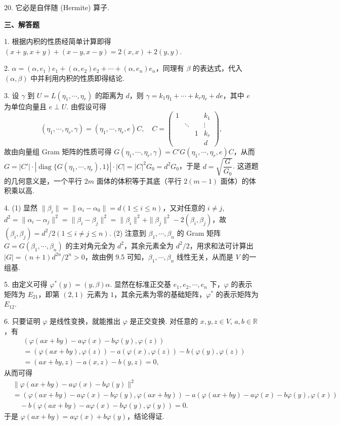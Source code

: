 \documentclass[UTF8,12pt,a4paper,fontset=fandol]{ctexart}
\begin{document}
20. 它必是自伴随 (Hermite) 算子.

\noindent\textbf{三、解答题}

1. 根据内积的性质经简单计算即得 $(x+y,x+y)+(x-y,x-y)=2(x,x)+2(y,y)$.

2. $\alpha=(\alpha,e_1)e_1+(\alpha,e_2)e_2+\cdots+(\alpha,e_n)e_n$，同理有 $\beta$ 的表达式，代入 $(\alpha,\beta)$ 中并利用内积的性质即得结论.

3. 设 $\gamma$ 到 $U=L(\eta_1,\cdots,\eta_r)$ 的距离为 $d$，则 $\gamma=k_1\eta_1+\cdots+k_r\eta_r+de$，其中 $e$ 为单位向量且 $e\perp U$. 由假设可得
\[
(\eta_1,\cdots,\eta_r,\gamma)=(\eta_1,\cdots,\eta_r,e)C,\quad
C=\begin{pmatrix}
1&&&k_1\\
&\ddots&&\vdots\\
&&1&k_r\\
&&&d
\end{pmatrix},
\]
故由向量组 Gram 矩阵的性质可得 $G(\eta_1,\cdots,\eta_r,\gamma)=C'G(\eta_1,\cdots,\eta_r,e)C$，从而 $G=|C'|\cdot|\operatorname{diag}\{G(\eta_1,\cdots,\eta_r),1\}|\cdot|C|=|C|^2G_0=d^2G_0$，于是 $d=\sqrt{\dfrac{G}{G_0}}$. 这道题的几何意义是，一个平行 $2m$ 面体的体积等于其底（平行 $2(m-1)$ 面体）的体积乘以高.

4. (1) 显然 $\|\beta_i\|=\|\alpha_i-\alpha_0\|=d(1\le i\le n)$，又对任意的 $i\ne j$, $d^2=\|\alpha_i-\alpha_j\|^2=\|\beta_i-\beta_j\|^2=\|\beta_i\|^2+\|\beta_j\|^2-2(\beta_i,\beta_j)$，故 $(\beta_i,\beta_j)=d^2/2(1\le i\ne j\le n)$. (2) 注意到 $\beta_1,\cdots,\beta_n$ 的 Gram 矩阵 $G=G(\beta_1,\cdots,\beta_n)$ 的主对角元全为 $d^2$，其余元素全为 $d^2/2$，用求和法可计算出 $|G|=(n+1)d^{2n}/2^n>0$，故由例 9.5 可知，$\beta_1,\cdots,\beta_n$ 线性无关，从而是 $V$ 的一组基.

5. 由定义可得 $\varphi^*(y)=(y,\beta)\alpha$. 显然在标准正交基 $e_1,e_2,\cdots,e_n$ 下，$\varphi$ 的表示矩阵为 $E_{21}$，即第 $(2,1)$ 元素为 $1$，其余元素为零的基础矩阵，$\varphi^*$ 的表示矩阵为 $E_{12}$.

6. 只要证明 $\varphi$ 是线性变换，就能推出 $\varphi$ 是正交变换. 对任意的 $x,y,z\in V$, $a,b\in\mathbb{R}$，有
\[
\begin{aligned}
&(\varphi(ax+by)-a\varphi(x)-b\varphi(y),\varphi(z))\\
&=(\varphi(ax+by),\varphi(z))-a(\varphi(x),\varphi(z))-b(\varphi(y),\varphi(z))\\
&=(ax+by,z)-a(x,z)-b(y,z)=0,
\end{aligned}
\]
从而可得
\[
\begin{aligned}
&\|\varphi(ax+by)-a\varphi(x)-b\varphi(y)\|^2\\
&=(\varphi(ax+by)-a\varphi(x)-b\varphi(y),\varphi(ax+by))
-a(\varphi(ax+by)-a\varphi(x)-b\varphi(y),\varphi(x))\\
&\quad -b(\varphi(ax+by)-a\varphi(x)-b\varphi(y),\varphi(y))=0.
\end{aligned}
\]
于是 $\varphi(ax+by)=a\varphi(x)+b\varphi(y)$，结论得证.
\end{document}
